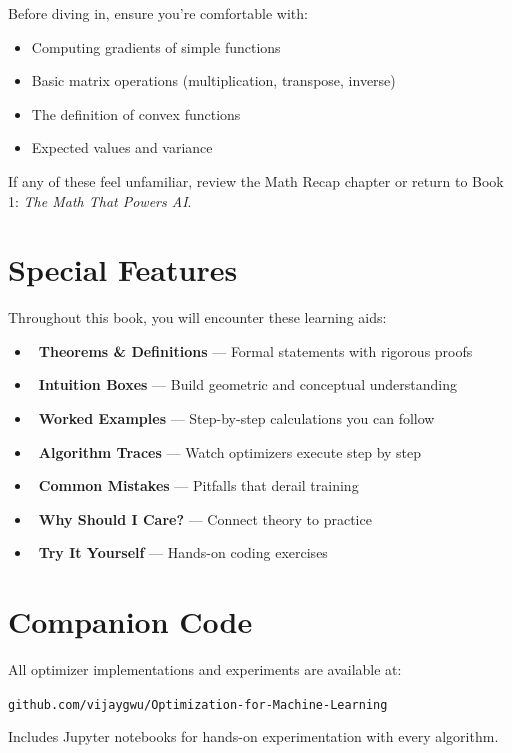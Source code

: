 \documentclass[../main.tex]{subfiles}
\begin{document}
Before diving in, ensure you're comfortable with:
\begin{itemize}[itemsep=0.3em]
    \item Computing gradients of simple functions
    \item Basic matrix operations (multiplication, transpose, inverse)
    \item The definition of convex functions
    \item Expected values and variance
\end{itemize}

If any of these feel unfamiliar, review the Math Recap chapter or return to Book 1: \textit{The Math That Powers AI}.

\section*{Special Features}

Throughout this book, you will encounter these learning aids:

\begin{itemize}[itemsep=0.5em]
    \item {\large\textcolor{thmframe}{\faBookOpen}}\ \textbf{Theorems \& Definitions} --- Formal statements with rigorous proofs
    \item {\large\textcolor{exframe}{\faLightbulb}}\ \textbf{Intuition Boxes} --- Build geometric and conceptual understanding
    \item {\large\textcolor{exframe}{\faPencilAlt}}\ \textbf{Worked Examples} --- Step-by-step calculations you can follow
    \item {\large\textcolor{primaryblue}{\faPlay}}\ \textbf{Algorithm Traces} --- Watch optimizers execute step by step
    \item {\large\textcolor{warnframe}{\faExclamationTriangle}}\ \textbf{Common Mistakes} --- Pitfalls that derail training
    \item {\large\textcolor{primarygreen}{\faQuestionCircle}}\ \textbf{Why Should I Care?} --- Connect theory to practice
    \item {\large\textcolor{accentorange}{\faLaptopCode}}\ \textbf{Try It Yourself} --- Hands-on coding exercises
\end{itemize}

\section*{Companion Code}

All optimizer implementations and experiments are available at:

\begin{center}
\texttt{github.com/vijaygwu/Optimization-for-Machine-Learning}
\end{center}

Includes Jupyter notebooks for hands-on experimentation with every algorithm.

\cleardoublepage
\end{document}
